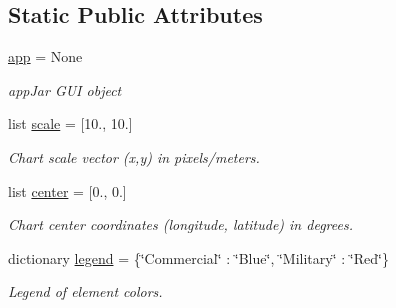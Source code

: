 \subsection*{Static Public Attributes}
\begin{DoxyCompactItemize}
\item 
\mbox{\label{class_python_01_g_u_i_1_1src_1_1map_1_1_map_aa268f8584460f5b610910c82e6996121}} 
\hyperlink{class_python_01_g_u_i_1_1src_1_1map_1_1_map_aa268f8584460f5b610910c82e6996121}{app} = None
\begin{DoxyCompactList}\small\item\em app\+Jar G\+UI object \end{DoxyCompactList}\item 
\mbox{\label{class_python_01_g_u_i_1_1src_1_1map_1_1_map_a2073ffe7f02a73b44883d38efeaa244a}} 
list \hyperlink{class_python_01_g_u_i_1_1src_1_1map_1_1_map_a2073ffe7f02a73b44883d38efeaa244a}{scale} = \mbox{[}10., 10.\mbox{]}
\begin{DoxyCompactList}\small\item\em Chart scale vector (x,y) in pixels/meters. \end{DoxyCompactList}\item 
\mbox{\label{class_python_01_g_u_i_1_1src_1_1map_1_1_map_afbffe7171a6f8520c328e7817b01afc6}} 
list \hyperlink{class_python_01_g_u_i_1_1src_1_1map_1_1_map_afbffe7171a6f8520c328e7817b01afc6}{center} = \mbox{[}0., 0.\mbox{]}
\begin{DoxyCompactList}\small\item\em Chart center coordinates (longitude, latitude) in degrees. \end{DoxyCompactList}\item 
\mbox{\label{class_python_01_g_u_i_1_1src_1_1map_1_1_map_ae5306b212f95d3430c8710e2f607ebff}} 
dictionary \hyperlink{class_python_01_g_u_i_1_1src_1_1map_1_1_map_ae5306b212f95d3430c8710e2f607ebff}{legend} = \{\char`\"{}Commercial\char`\"{} \+: \char`\"{}Blue\char`\"{}, \char`\"{}Military\char`\"{} \+: \char`\"{}Red\char`\"{}\}
\begin{DoxyCompactList}\small\item\em Legend of element colors. \end{DoxyCompactList}\end{DoxyCompactItemize}


